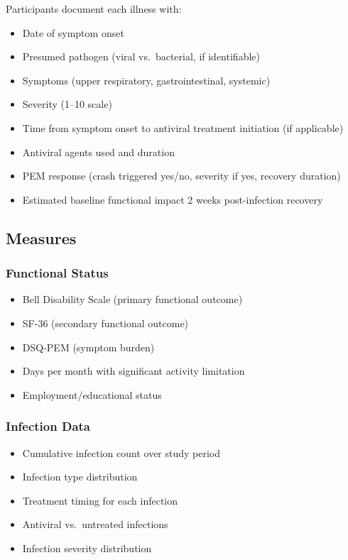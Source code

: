 Participants document each illness with:
\begin{itemize}
    \item Date of symptom onset
    \item Presumed pathogen (viral vs.\ bacterial, if identifiable)
    \item Symptoms (upper respiratory, gastrointestinal, systemic)
    \item Severity (1--10 scale)
    \item Time from symptom onset to antiviral treatment initiation (if applicable)
    \item Antiviral agents used and duration
    \item PEM response (crash triggered yes/no, severity if yes, recovery duration)
    \item Estimated baseline functional impact 2 weeks post-infection recovery
\end{itemize}

\subsection{Measures}

\subsubsection{Functional Status}
\begin{itemize}
    \item Bell Disability Scale (primary functional outcome)
    \item SF-36 (secondary functional outcome)
    \item DSQ-PEM (symptom burden)
    \item Days per month with significant activity limitation
    \item Employment/educational status
\end{itemize}

\subsubsection{Infection Data}
\begin{itemize}
    \item Cumulative infection count over study period
    \item Infection type distribution
    \item Treatment timing for each infection
    \item Antiviral vs.\ untreated infections
    \item Infection severity distribution
\end{itemize}


